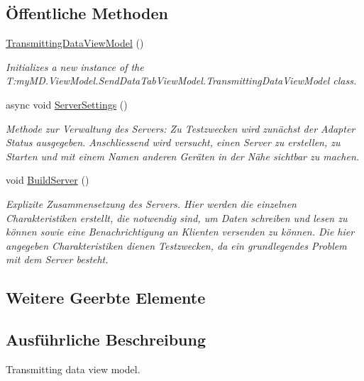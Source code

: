 \subsection*{Öffentliche Methoden}
\begin{DoxyCompactItemize}
\item 
\mbox{\hyperlink{classmy_m_d_1_1_view_model_1_1_send_data_tab_view_model_1_1_transmitting_data_view_model_a010f4e5a18f39b8df0e14fe18c13c1a3}{Transmitting\+Data\+View\+Model}} ()
\begin{DoxyCompactList}\small\item\em Initializes a new instance of the T\+:my\+M\+D.\+View\+Model.\+Send\+Data\+Tab\+View\+Model.\+Transmitting\+Data\+View\+Model class. \end{DoxyCompactList}\item 
async void \mbox{\hyperlink{classmy_m_d_1_1_view_model_1_1_send_data_tab_view_model_1_1_transmitting_data_view_model_a5de8914eeb10e78166ef2a0c6bc65af4}{Server\+Settings}} ()
\begin{DoxyCompactList}\small\item\em Methode zur Verwaltung des Servers\+: Zu Testzwecken wird zunächst der Adapter Status ausgegeben. Anschliessend wird versucht, einen Server zu erstellen, zu Starten und mit einem Namen anderen Geräten in der Nähe sichtbar zu machen. \end{DoxyCompactList}\item 
void \mbox{\hyperlink{classmy_m_d_1_1_view_model_1_1_send_data_tab_view_model_1_1_transmitting_data_view_model_acd2a4a33751f02b1f16bb8c666b98f34}{Build\+Server}} ()
\begin{DoxyCompactList}\small\item\em Explizite Zusammensetzung des Servers. Hier werden die einzelnen Charakteristiken erstellt, die notwendig sind, um Daten schreiben und lesen zu können sowie eine Benachrichtigung an Klienten versenden zu können. Die hier angegeben Charakteristiken dienen Testzwecken, da ein grundlegendes Problem mit dem Server besteht. \end{DoxyCompactList}\end{DoxyCompactItemize}
\subsection*{Weitere Geerbte Elemente}


\subsection{Ausführliche Beschreibung}
Transmitting data view model. 



